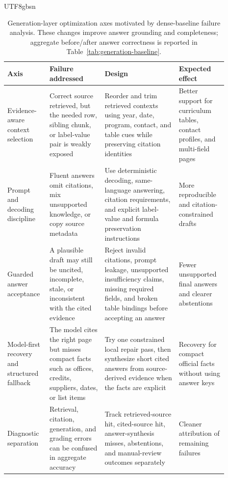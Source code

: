 \documentclass{article}
\begin{document}
\begin{CJK*}{UTF8}{gbsn}
\begin{table}[H]
\centering
\scriptsize
\setlength{\tabcolsep}{3pt}
\caption{Generation-layer optimization axes motivated by dense-baseline failure analysis. These changes improve answer grounding and completeness; aggregate before/after answer correctness is reported in Table~\ref{tab:generation-baseline}.}
\label{tab:generation-optimization-axes}
\begin{tabular}{@{}p{0.15\linewidth}p{0.23\linewidth}p{0.31\linewidth}p{0.20\linewidth}@{}}
\toprule
Axis & Failure addressed & Design & Expected effect \\
\midrule
Evidence-aware context selection & Correct source retrieved, but the needed row, sibling chunk, or label-value pair is weakly exposed & Reorder and trim retrieved contexts using year, date, program, contact, and table cues while preserving citation identities & Better support for curriculum tables, contact profiles, and multi-field pages \\
Prompt and decoding discipline & Fluent answers omit citations, mix unsupported knowledge, or copy source metadata & Use deterministic decoding, same-language answering, citation requirements, and explicit label-value and formula preservation instructions & More reproducible and citation-constrained drafts \\
Guarded answer acceptance & A plausible draft may still be uncited, incomplete, stale, or inconsistent with the cited evidence & Reject invalid citations, prompt leakage, unsupported insufficiency claims, missing required fields, and broken table bindings before accepting an answer & Fewer unsupported final answers and clearer abstentions \\
Model-first recovery and structured fallback & The model cites the right page but misses compact facts such as offices, credits, suppliers, dates, or list items & Try one constrained local repair pass, then synthesize short cited answers from source-derived evidence when the facts are explicit & Recovery for compact official facts without using answer keys \\
Diagnostic separation & Retrieval, citation, generation, and grading errors can be confused in aggregate accuracy & Track retrieved-source hit, cited-source hit, answer-synthesis misses, abstentions, and manual-review outcomes separately & Cleaner attribution of remaining failures \\
\bottomrule
\end{tabular}
\end{table}


\end{CJK*}
\end{document}
